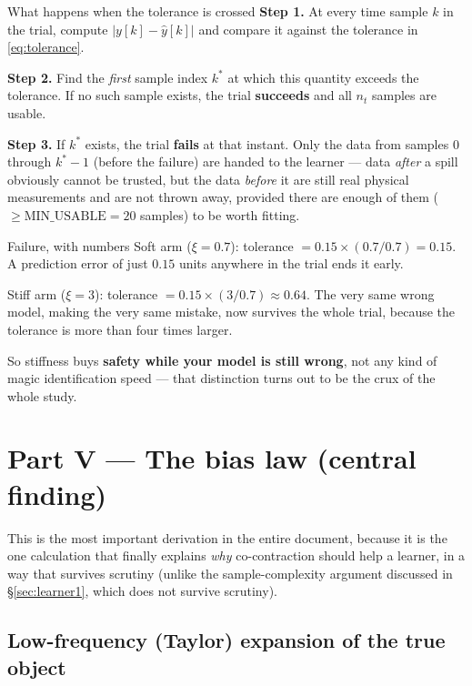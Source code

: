 \documentclass[11pt,a4paper]{article}
\begin{document}
\begin{stepbox}{What happens when the tolerance is crossed}
\textbf{Step 1.} At every time sample $k$ in the trial, compute
$|y[k]-\hat y[k]|$ and compare it against the tolerance in
\eqref{eq:tolerance}.

\textbf{Step 2.} Find the \emph{first} sample index $k^\ast$ at which this
quantity exceeds the tolerance. If no such sample exists, the trial
\textbf{succeeds} and all $n_t$ samples are usable.

\textbf{Step 3.} If $k^\ast$ exists, the trial \textbf{fails} at that instant.
Only the data from samples $0$ through $k^\ast-1$ (before the failure) are
handed to the learner --- data \emph{after} a spill obviously cannot be
trusted, but the data \emph{before} it are still real physical measurements
and are not thrown away, provided there are enough of them
($\ge\mathrm{MIN\_USABLE}=20$ samples) to be worth fitting.
\end{stepbox}

\begin{examplebox}{Failure, with numbers}
Soft arm ($\xi=0.7$): tolerance $=0.15\times(0.7/0.7)=0.15$. A prediction
error of just $0.15$ units anywhere in the trial ends it early.

Stiff arm ($\xi=3$): tolerance $=0.15\times(3/0.7)\approx0.64$. The very same
wrong model, making the very same mistake, now survives the whole trial,
because the tolerance is more than four times larger.

So stiffness buys \textbf{safety while your model is still wrong}, not any
kind of magic identification speed --- that distinction turns out to be the
crux of the whole study.
\end{examplebox}

\section{Part V --- The bias law (central finding)}
\label{sec:bias}

This is the most important derivation in the entire document, because it is
the one calculation that finally explains \emph{why} co-contraction should
help a learner, in a way that survives scrutiny (unlike the sample-complexity
argument discussed in \S\ref{sec:learner1}, which does not survive scrutiny).

\subsection{Low-frequency (Taylor) expansion of the true object}
\end{document}
